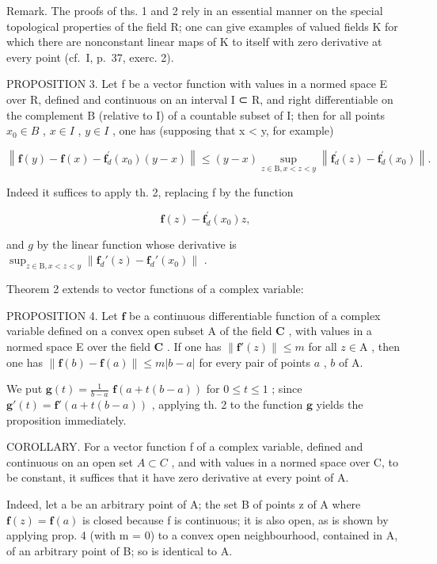 Remark. The proofs of ths. 1 and 2 rely in an essential manner on the special topological properties of the field R; one can give examples of valued fields K for which there are nonconstant linear maps of K to itself with zero derivative at every point (cf.~I, p.~37, exerc. 2).

PROPOSITION 3. Let f be a vector function with values in a normed space E over R, defined and continuous on an interval I ⊂ R, and right differentiable on the complement B (relative to I) of a countable subset of I; then for all points \(x_{0} \in B\) , \(x \in I\) , \(y \in I\) , one has (supposing that x \textless{} y, for example)

\[
\left\| \mathbf {f} (y) - \mathbf {f} (x) - \mathbf {f} _ {d} ^ {\prime} (x _ {0}) (y - x) \right\| \leqslant (y - x) \sup _ {z \in \mathrm{B}, x <   z <   y} \left\| \mathbf {f} _ {d} ^ {\prime} (z) - \mathbf {f} _ {d} ^ {\prime} (x _ {0}) \right\|.\tag{9}
\]

Indeed it suffices to apply th. 2, replacing f by the function

\[
\mathbf {f} (z) - \mathbf {f} _ {d} ^ {\prime} (x _ {0}) z,
\]

and \(g\) by the linear function whose derivative is \(\sup_{z\in \mathrm{B}, x < z < y}\left\| \mathbf{f}_d'(z) - \mathbf{f}_d'(x_0)\right\|\) .

Theorem 2 extends to vector functions of a complex variable:

PROPOSITION 4. Let \(\mathbf{f}\) be a continuous differentiable function of a complex variable defined on a convex open subset A of the field \(\mathbf{C}\) , with values in a normed space E over the field \(\mathbf{C}\) . If one has \(\| \mathbf{f}'(z)\| \leqslant m\) for all \(z\in \mathrm{A}\) , then one has \(\| \mathbf{f}(b) - \mathbf{f}(a)\| \leqslant m|b - a|\) for every pair of points \(a\) , \(b\) of A.

We put \(\mathbf{g}(t) = \frac{1}{b - a}\) \(\mathbf{f}(a + t(b - a))\) for \(0 \leqslant t \leqslant 1\) ; since \(\mathbf{g}'(t) = \mathbf{f}'(a + t(b - a))\) , applying th. 2 to the function \(\mathbf{g}\) yields the proposition immediately.

COROLLARY. For a vector function f of a complex variable, defined and continuous on an open set \(A \subset C\) , and with values in a normed space over C, to be constant, it suffices that it have zero derivative at every point of A.

Indeed, let a be an arbitrary point of A; the set B of points z of A where \(\mathbf{f}(z) = \mathbf{f}(a)\) is closed because f is continuous; it is also open, as is shown by applying prop. 4 (with m = 0) to a convex open neighbourhood, contained in A, of an arbitrary point of B; so is identical to A.

